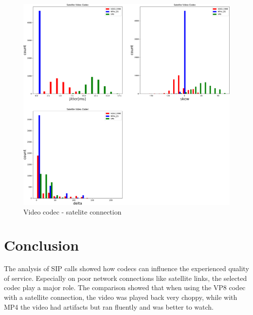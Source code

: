 \documentclass[parskip=full]{scrartcl}
\begin{document}
\begin{figure}[!ht]
	\centering %
	\includegraphics[width=\textwidth]{images/satelite-video-histogram.pdf} %
	\caption{Video codec - satelite connection} 
	\label{fig:Video} %
\end{figure} 

\newpage
\section{Conclusion}

The analysis of SIP calls showed how codecs can influence the experienced quality of service. 
Especially on poor network connections like satellite links, the selected codec play a major role.
The comparison showed that when using the VP8 codec with a satellite connection, the video was played back very choppy, while with MP4 the video had artifacts but ran fluently and was better to watch.


\printbibliography
\end{document}

